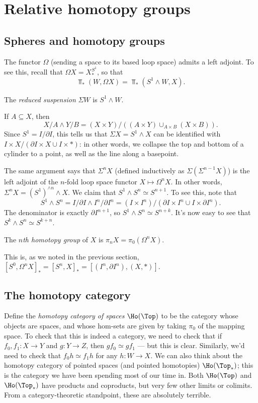 \section{Relative homotopy groups}
\subsection{Spheres and homotopy groups}
The functor $\Omega$ (sending a space to its based loop space) admits a left adjoint.
To see this, recall that $\Omega X = X^{S^1}_\ast$, so that
$$\Top_\ast(W,\Omega X) = \Top_\ast(S^1\wedge W,X).$$
\begin{definition}
    The \emph{reduced suspension} $\Sigma W$ is $S^1\wedge W$.
\end{definition}
If $A\subseteq X$, then
$$X/A\wedge Y/B = (X\times Y)/((A\times Y)\cup_{A\times B}(X\times B)).$$
Since $S^1 = I/\partial I$, this tells us that $\Sigma X = S^1\wedge X$ can be identified with
$I\times X/(\partial I \times X\cup I\times \ast)$: in other words, we collapse the top and bottom of a cylinder to a point,
as well as the line along a basepoint.

The same argument says that $\Sigma^n X$ (defined inductively as $\Sigma(\Sigma^{n-1} X)$)
is the left adjoint of the $n$-fold loop space functor $X\mapsto \Omega^n X$.
In other words, $\Sigma^n X = (S^1)^{\wedge n}\wedge X$.
We claim that $S^1\wedge S^n \simeq S^{n+1}$.
To see this, note that
$$S^1\wedge S^n = I/\partial I\wedge I^n/\partial I^n = (I\times I^n)/(\partial I\times I^n\cup I\times \partial I^n).$$
The denominator is exactly $\partial I^{n+1}$, so $S^1\wedge S^n\simeq S^{n+k}$.
It's now easy to see that $S^k\wedge S^n\simeq S^{k+n}$.
\begin{definition}
    The \emph{$n$th homotopy group} of $X$ is $\pi_n X = \pi_0(\Omega^n X)$.
\end{definition}
This is, as we noted in the previous section, $[S^0,\Omega^n X]_\ast = [S^n, X]_\ast = [(I^n,\partial I^n),(X,\ast)]$.

\subsection{The homotopy category}
Define the \emph{homotopy category of spaces} $\Ho(\Top)$ to be the category
whose objects are spaces, and whose hom-sets are given by taking $\pi_0$ of the mapping space.
To check that this is indeed a category, we need to check that if $f_0,f_1:X\to Y$ and $g:Y\to Z$, then $gf_0\simeq gf_1$ ---
but this is clear.
Similarly, we'd need to check that $f_0h\simeq f_1h$ for any $h:W\to X$.
We can also think about the homotopy category of pointed spaces (and pointed homotopies) $\Ho(\Top_\ast)$; this is the category
we have been spending most of our time in.
Both $\Ho(\Top)$ and $\Ho(\Top_\ast)$ have products and coproducts, but very few other limits or colimits.
From a category-theoretic standpoint, these are absolutely terrible.

